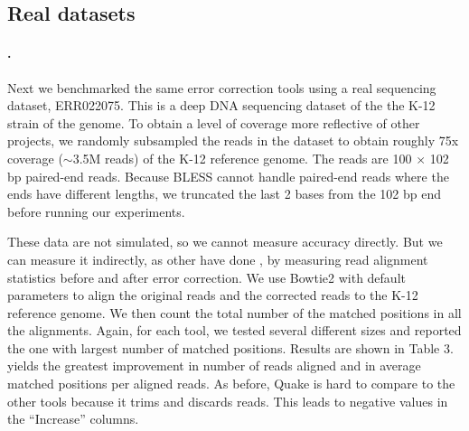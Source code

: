 \documentclass{bmcart}
\begin{document}



\subsection*{Real datasets}
\paragraph{\ecolinoemph.}  Next we benchmarked the same error correction tools using a real sequencing dataset, ERR022075.
This is a deep DNA sequencing dataset of the the K-12 strain of the \ecoli genome.
To obtain a level of coverage more reflective of other projects, we randomly subsampled the reads in the dataset to obtain roughly 75x coverage ($\sim$3.5M reads) of the \ecoli K-12 reference genome.
The reads are 100 $\times$ 102 bp paired-end reads.
Because BLESS cannot handle paired-end reads where the ends have different lengths, we truncated the last 2 bases from the 102 bp end before running our experiments.

 
These data are not simulated, so we cannot measure accuracy directly.  But we can measure it indirectly, as other have done \cite{heo2014bless}, by measuring read alignment statistics before and after error correction.  We use Bowtie2 \cite{langmead2012fast} with default parameters to align the original reads and the corrected reads to the \ecoli K-12 reference genome.  We then count the total number of the matched positions in all the alignments. Again, for each tool, we tested several different \kmer sizes and reported the one with largest number of matched positions. Results are shown in Table 3.  \tool yields the greatest improvement in number of reads aligned and in average matched positions per aligned reads.  As before, Quake is hard to compare to the other tools because it trims and discards reads.  This leads to negative values in the ``Increase'' columns.
\end{document}
